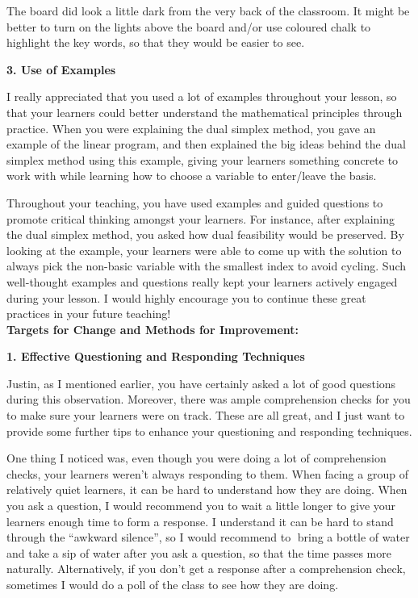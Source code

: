 \documentclass{article}
\begin{document}
The board did look a little dark from the very back of the classroom. It might be better to turn on the lights above the board and/or use coloured chalk to highlight the key words, so that they would be easier to see.

\textbf{3. Use of Examples}

I really appreciated that you used a lot of examples throughout your lesson, so that your learners could better understand the mathematical principles through practice. When you were explaining the dual simplex method, you gave an example of the linear program, and then explained the big ideas behind the dual simplex method using this example, giving your learners something concrete to work with while learning how to choose a variable to enter/leave the basis.

Throughout your teaching, you have used examples and guided questions to promote critical thinking amongst your learners. For instance, after explaining the dual simplex method, you asked how dual feasibility would be preserved. By looking at the example, your learners were able to come up with the solution to always pick the non-basic variable with the smallest index to avoid cycling. Such well-thought examples and questions really kept your learners actively engaged during your lesson. I would highly encourage you to continue these great practices in your future teaching!\\
\textbf{Targets for Change and Methods for Improvement:}

\textbf{1. Effective Questioning and Responding Techniques}

Justin, as I mentioned earlier, you have certainly asked a lot of good questions during this observation. Moreover, there was ample comprehension checks for you to make sure your learners were on track. These are all great, and I just want to provide some further tips to enhance your questioning and responding techniques.

One thing I noticed was, even though you were doing a lot of comprehension checks, your
learners weren’t always responding to them. When facing a group of relatively quiet learners, it can be hard to understand how they are doing. When you ask a question, I would recommend you to wait a little longer to give your learners enough time to form a response. I understand it can be hard to stand through the “awkward silence”, so I would recommend to
bring a bottle of water and take a sip of water after you ask a question, so that the time passes more naturally. Alternatively, if you don’t get a response after a comprehension check, sometimes I would do a poll of the class to see how they are doing.
\end{document}
